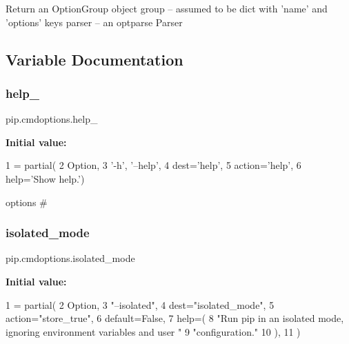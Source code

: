 \begin{DoxyVerb}Return an OptionGroup object
group  -- assumed to be dict with 'name' and 'options' keys
parser -- an optparse Parser
\end{DoxyVerb}
 

\subsection{Variable Documentation}
\mbox{\label{namespacepip_1_1cmdoptions_aecd6fe12bddb7700267409378e3f1bc6}} 
\subsubsection{\texorpdfstring{help\+\_\+}{help\_}}
{\footnotesize\ttfamily pip.\+cmdoptions.\+help\+\_\+}

{\bfseries Initial value\+:}
\begin{DoxyCode}
1 =  partial(
2     Option,
3     \textcolor{stringliteral}{'-h'}, \textcolor{stringliteral}{'--help'},
4     dest=\textcolor{stringliteral}{'help'},
5     action=\textcolor{stringliteral}{'help'},
6     help=\textcolor{stringliteral}{'Show help.'})
\end{DoxyCode}


options \# 

\mbox{\label{namespacepip_1_1cmdoptions_a7d1cbf6fac2153496a9f1ab9f882391b}} 
\subsubsection{\texorpdfstring{isolated\+\_\+mode}{isolated\_mode}}
{\footnotesize\ttfamily pip.\+cmdoptions.\+isolated\+\_\+mode}

{\bfseries Initial value\+:}
\begin{DoxyCode}
1 =  partial(
2     Option,
3     \textcolor{stringliteral}{"--isolated"},
4     dest=\textcolor{stringliteral}{"isolated\_mode"},
5     action=\textcolor{stringliteral}{"store\_true"},
6     default=\textcolor{keyword}{False},
7     help=(
8         \textcolor{stringliteral}{"Run pip in an isolated mode, ignoring environment variables and user "}
9         \textcolor{stringliteral}{"configuration."}
10     ),
11 )
\end{DoxyCode}
\mbox{\label{namespacepip_1_1cmdoptions_a1b6e4dc17d4b074a0b509299d44d6f4f}} 
